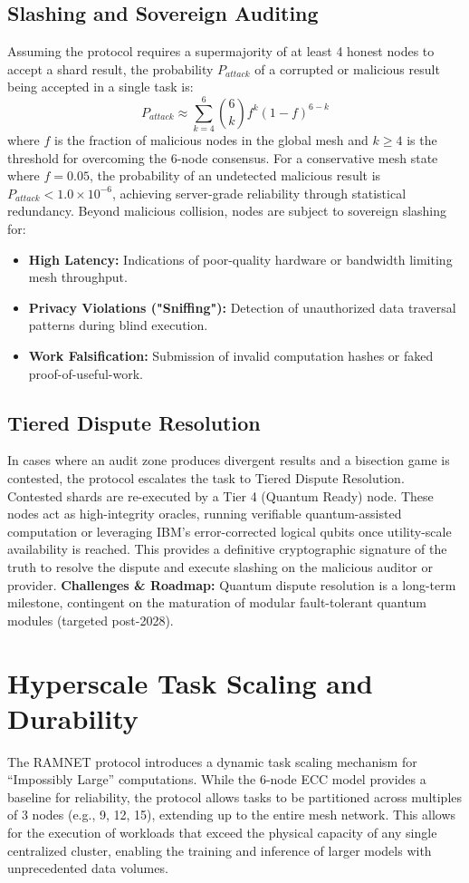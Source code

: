 \documentclass[conference]{IEEEtran}
\begin{document}
\subsection{Slashing and Sovereign Auditing}
Assuming the protocol requires a supermajority of at least 4 honest nodes to accept a shard result, the probability $P_{attack}$ of a corrupted or malicious result being accepted in a single task is:
\begin{equation}
P_{attack} \approx \sum_{k=4}^{6} \binom{6}{k} f^k (1-f)^{6-k}
\end{equation}
where $f$ is the fraction of malicious nodes in the global mesh and $k \geq 4$ is the threshold for overcoming the 6-node consensus. For a conservative mesh state where $f = 0.05$, the probability of an undetected malicious result is $P_{attack} < 1.0 \times 10^{-6}$, achieving server-grade reliability through statistical redundancy. Beyond malicious collision, nodes are subject to sovereign slashing for:
\begin{itemize}
    \item \textbf{High Latency:} Indications of poor-quality hardware or bandwidth limiting mesh throughput.
    \item \textbf{Privacy Violations ("Sniffing"):} Detection of unauthorized data traversal patterns during blind execution.
    \item \textbf{Work Falsification:} Submission of invalid computation hashes or faked proof-of-useful-work.
\end{itemize}
\subsection{Tiered Dispute Resolution}
In cases where an audit zone produces divergent results and a bisection game is contested, the protocol escalates the task to Tiered Dispute Resolution. Contested shards are re-executed by a Tier 4 (Quantum Ready) node. These nodes act as high-integrity oracles, running verifiable quantum-assisted computation or leveraging IBM's error-corrected logical qubits once utility-scale availability is reached. This provides a definitive cryptographic signature of the truth to resolve the dispute and execute slashing on the malicious auditor or provider. \textbf{Challenges \& Roadmap:} Quantum dispute resolution is a long-term milestone, contingent on the maturation of modular fault-tolerant quantum modules (targeted post-2028).

\section{Hyperscale Task Scaling and Durability}
The RAMNET protocol introduces a dynamic task scaling mechanism for ``Impossibly Large'' computations. While the 6-node ECC model provides a baseline for reliability, the protocol allows tasks to be partitioned across multiples of 3 nodes (e.g., 9, 12, 15), extending up to the entire mesh network. This allows for the execution of workloads that exceed the physical capacity of any single centralized cluster, enabling the training and inference of larger models with unprecedented data volumes. 
\end{document}
